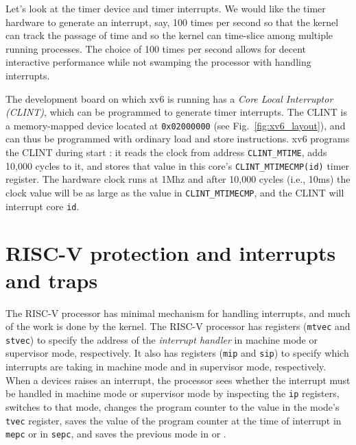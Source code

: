 Let's look at the timer device and timer interrupts.  We would like
the timer hardware to generate an interrupt, say, 100 times per
second so that the kernel can track the passage of time and so the
kernel can time-slice among multiple running processes.  The choice of
100 times per second allows for decent interactive performance while
not swamping the processor with handling interrupts.

The development board on which xv6 is running has a \textit{Core Local
  Interruptor (CLINT)}, which
can be programmed to generate timer interrupts.  The CLINT is a
memory-mapped device located at \lstinline{0x02000000} (see
Fig.~\ref{fig:xv6_layout}), and can thus be programmed with ordinary
load and store instructions.  xv6 programs the CLINT during start
: it reads the clock from address
\lstinline{CLINT_MTIME}, adds 10,000 cycles to it, and stores that
value in this core's \lstinline{CLINT_MTIMECMP(id)} timer register.
The hardware clock runs at 1Mhz and after 10,000 cycles (i.e., 10ms) the clock
value will be as large as the value in \lstinline{CLINT_MTIMECMP}, and
the CLINT will interrupt core \lstinline{id}.

\section{RISC-V protection and interrupts and traps}

The RISC-V processor has minimal mechanism for handling interrupts,
and much of the work is done by the kernel.  The RISC-V processor has
registers (\lstinline{mtvec} and
\lstinline{stvec}) to specify the
address of the \textit{interrupt handler} in
machine mode or supervisor mode, respectively.  It also has registers
(\lstinline{mip} and
\lstinline{sip}) to specify which
interrupts are taking in machine mode and in supervisor mode,
respectively.  When a devices raises an interrupt, the processor sees
whether the interrupt must be handled in machine mode or supervisor
mode by inspecting the \lstinline{ip} registers, switches to that
mode, changes the program counter to the value in the mode's
\lstinline{tvec} register, saves the value of the program counter at
the time of interrupt in \lstinline{mepc}
or in \lstinline{sepc}, and saves the
previous mode in  or .

